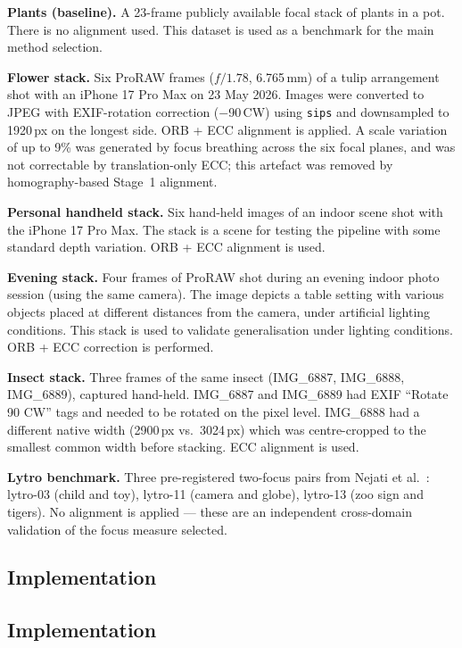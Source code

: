\documentclass[conference]{IEEEtran}
\begin{document}
\textbf{Plants (baseline).} A 23-frame publicly available focal stack of plants in a pot. There is no alignment used. This dataset is used as a benchmark for the main method selection.

\textbf{Flower stack.} Six ProRAW frames ($f/1.78$, 6.765\,mm) of a tulip arrangement shot with an iPhone 17 Pro Max on 23 May 2026. Images were converted to JPEG with EXIF-rotation correction ($-$90\,CW) using \texttt{sips} and downsampled to 1920\,px on the longest side. ORB + ECC alignment is applied. A scale variation of up to 9\% was generated by focus breathing across the six focal planes, and was not correctable by translation-only ECC; this artefact was removed by homography-based Stage~1 alignment.

\textbf{Personal handheld stack.} Six hand-held images of an indoor scene shot with the iPhone 17 Pro Max. The stack is a scene for testing the pipeline with some standard depth variation. ORB + ECC alignment is used.

\textbf{Evening stack.} Four frames of ProRAW shot during an evening indoor photo session (using the same camera). The image depicts a table setting with various objects placed at different distances from the camera, under artificial lighting conditions. This stack is used to validate generalisation under lighting conditions. ORB + ECC correction is performed.

\textbf{Insect stack.} Three frames of the same insect (IMG\_6887, IMG\_6888, IMG\_6889), captured hand-held. IMG\_6887 and IMG\_6889 had EXIF ``Rotate 90 CW'' tags and needed to be rotated on the pixel level. IMG\_6888 had a different native width (2900\,px vs.\ 3024\,px) which was centre-cropped to the smallest common width before stacking. ECC alignment is used.

\textbf{Lytro benchmark.} Three pre-registered two-focus pairs from Nejati et al.~\cite{nejati2015multi}: lytro-03 (child and toy), lytro-11 (camera and globe), lytro-13 (zoo sign and tigers). No alignment is applied --- these are an independent cross-domain validation of the focus measure selected.


\subsection{Implementation}

\subsection{Implementation}
\end{document}
